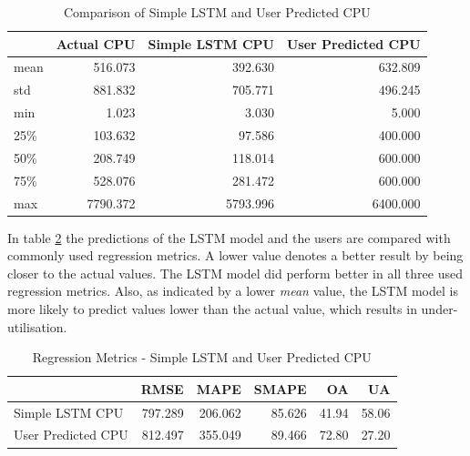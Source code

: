       \begin{table}
        \centering
        \caption{Comparison of Simple LSTM and User Predicted CPU}
        \label{tab:comparison-simple-lstm-user-predicted-cpu}
        \begin{tabular}{|l|rrr|}
          \toprule
          {} &  Actual CPU &  Simple LSTM CPU &  User Predicted CPU \\
          \midrule
          mean  &           516.073 &              392.630 &        632.809 \\
          std   &           881.832 &              705.771 &        496.245 \\
          min   &             1.023 &                3.030 &          5.000 \\
          25\%   &           103.632 &               97.586 &        400.000 \\
          50\%   &           208.749 &              118.014 &        600.000 \\
          75\%   &           528.076 &              281.472 &        600.000 \\
          max   &          7790.372 &             5793.996 &       6400.000 \\
          \bottomrule
          \end{tabular}
      \end{table}
      In table \ref{tab:regression-metrics-simple-lstm-user-predicted-cpu} the predictions of the LSTM model and the users are compared with commonly used regression metrics. A lower value denotes a better result by being closer to the actual values. The LSTM model did perform better in all three used regression metrics. Also, as indicated by a lower \emph{mean} value, the LSTM model is more likely to predict values lower than the actual value, which results in under-utilisation.

      \begin{table}
        \centering
        \caption{Regression Metrics - Simple LSTM and User Predicted CPU}
        \label{tab:regression-metrics-simple-lstm-user-predicted-cpu}
        \begin{tabular}{|l|rrrrr|}
          \toprule
          {} &     RMSE &     MAPE &   SMAPE &     OA &     UA \\
          \midrule
          Simple LSTM CPU &  797.289 &  206.062 &  85.626 &  41.94 &  58.06 \\
          User Predicted CPU &  812.497 &  355.049 &  89.466 &  72.80 &  27.20 \\
          \bottomrule
        \end{tabular}
      \end{table}

